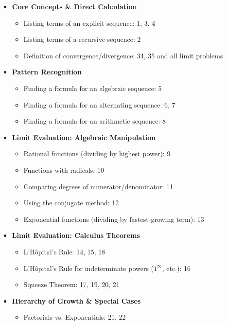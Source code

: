 \documentclass{article}
\begin{document}
\begin{itemize}
    \item \textbf{Core Concepts \& Direct Calculation}
        \begin{itemize}
            \item Listing terms of an explicit sequence: 1, 3, 4
            \item Listing terms of a recursive sequence: 2
            \item Definition of convergence/divergence: 34, 35 and all limit problems
        \end{itemize}
    \item \textbf{Pattern Recognition}
        \begin{itemize}
            \item Finding a formula for an algebraic sequence: 5
            \item Finding a formula for an alternating sequence: 6, 7
            \item Finding a formula for an arithmetic sequence: 8
        \end{itemize}
    \item \textbf{Limit Evaluation: Algebraic Manipulation}
        \begin{itemize}
            \item Rational functions (dividing by highest power): 9
            \item Functions with radicals: 10
            \item Comparing degrees of numerator/denominator: 11
            \item Using the conjugate method: 12
            \item Exponential functions (dividing by fastest-growing term): 13
        \end{itemize}
    \item \textbf{Limit Evaluation: Calculus Theorems}
        \begin{itemize}
            \item L'Hôpital's Rule: 14, 15, 18
            \item L'Hôpital's Rule for indeterminate powers ($1^\infty$, etc.): 16
            \item Squeeze Theorem: 17, 19, 20, 21
        \end{itemize}
    \item \textbf{Hierarchy of Growth \& Special Cases}
        \begin{itemize}
            \item Factorials vs. Exponentials: 21, 22

\end{itemize}
\end{itemize}
\end{document}
